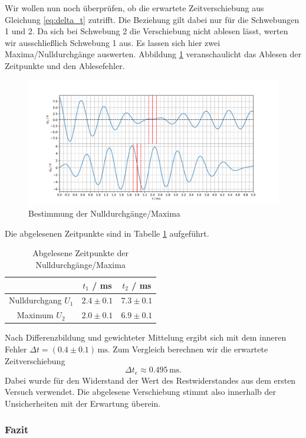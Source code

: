 Wir wollen nun noch überprüfen, ob die erwartete Zeitverschiebung aus Gleichung \ref{eq:delta_t} zutrifft. Die Beziehung gilt dabei nur für die Schwebungen 1 und 2. Da sich bei Schwebung 2 die Verschiebung nicht ablesen lässt, werten wir ausschließlich Schwebung 1 aus. Es lassen sich hier zwei Maxima/Nulldurchgänge auswerten. Abbildung \ref{abb:delta_t_bsp} veranschaulicht das Ablesen der Zeitpunkte und den Ablesefehler. 

\begin{figure}[H]
\centering
\includegraphics[width=\textwidth]{plots/delta_t_bsp.pdf}
\caption{Bestimmung der Nulldurchgänge/Maxima}
\label{abb:delta_t_bsp}
\end{figure}

Die abgelesenen Zeitpunkte sind in Tabelle \ref{tab:delta_t_zeiten} aufgeführt.

\begin{table}[H]
\centering
\begin{tabular}{c|c|c}
& $t_1$ / ms & $t_2$ / ms \\
\hline
Nulldurchgang $U_1$ & $2.4 \pm 0.1$ & $7.3 \pm 0.1$ \\
Maximum $U_2$ & $2.0 \pm 0.1$ & $6.9 \pm 0.1$
\end{tabular}
\caption{Abgelesene Zeitpunkte der Nulldurchgänge/Maxima}
\label{tab:delta_t_zeiten}
\end{table}

Nach Differenzbildung und gewichteter Mittelung ergibt sich mit dem inneren Fehler $\Delta t = (0.4 \pm 0.1) \, \mathrm{ms}$. Zum Vergleich berechnen wir die erwartete Zeitverschiebung
$$\Delta t_e \approx 0.495 \, \mathrm{ms}.$$
Dabei wurde für den Widerstand der Wert des Restwiderstandes aus dem ersten Versuch verwendet. Die abgelesene Verschiebung stimmt also innerhalb der Unsicherheiten mit der Erwartung überein.

\subsubsection{Fazit}


